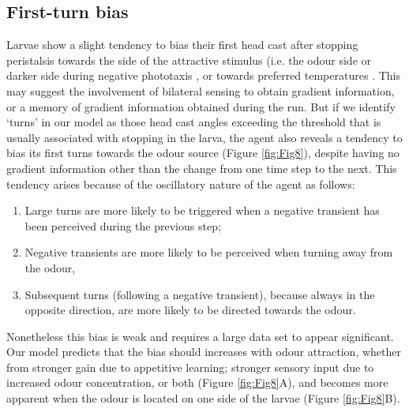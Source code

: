 \documentclass[10pt,a4paper]{article}
\begin{document}
\subsection{First-turn bias}
Larvae show a slight tendency to bias their first head cast after stopping peristalsis towards the side of the attractive stimulus (i.e. the odour side \citep{gomez2011active,gomez2012active} or darker side during negative phototaxis \citep{kane2013sensorimotor}, or towards preferred temperatures \citep{luo2010navigational}. This may suggest the involvement of bilateral sensing to obtain gradient information, or a memory of gradient information obtained during the run. But if we identify ‘turns’ in our model as those head cast angles exceeding the threshold that is usually associated with stopping in the larva, the agent also reveals a tendency to bias its first turns towards the odour source (Figure \ref{fig:Fig8}), despite having no gradient information other than the change from one time step to the next. This tendency arises because of the oscillatory nature of the agent as follows:
\begin{enumerate}
\item Large turns are more likely to be triggered when a negative transient has been perceived during the previous step; 
\item Negative transients are more likely to be perceived when turning away from the odour, 
\item Subsequent turns (following a negative transient), because always in the opposite direction, are more likely to be directed towards the odour. 
\end{enumerate}
Nonetheless this bias is weak and requires a large data set to appear significant. Our model predicts that the bias should  increases with odour attraction, whether from stronger gain due to appetitive learning; stronger sensory input due to increased odour concentration, or both (Figure \ref{fig:Fig8}A), and becomes more apparent when the odour is located on one side of the larvae (Figure \ref{fig:Fig8}B).
\end{document}
